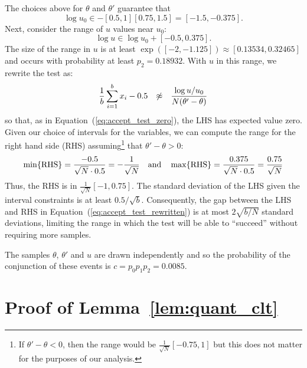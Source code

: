 \documentclass{article}
\begin{document}
The choices above for $\theta$ and $\theta'$ guarantee that
\begin{equation}\label{eq:log_uo_range}
    \log u_0 \in -[0.5,1][0.75,1.5] = [-1.5, -0.375].
\end{equation}
Next, consider the range of $u$ values near $u_0$:
\begin{equation}\label{eq:log_u_range}
    \log u \in \log u_0 + [-0.5,0.375].
\end{equation}
The size of the range in $u$ is at least $\exp([-2,-1.125]) \approx
[0.13534,0.32465]$ and occurs with probability at least $p_2=0.18932$. With $u$
in this range, we rewrite the test as:
\begin{equation}\label{eq:accept_test_rewritten}
    \frac{1}{b}\sum_{i=1}^b x_i-0.5 \hspace{0.1in} \not\approx \hspace{0.1in} \frac{\log u/u_0}{N(\theta'-\theta)}
\end{equation}
so that, as in Equation~(\ref{eq:accept_test_zero}), the LHS has expected value
zero.  Given our choice of intervals for the variables, we can compute the range
for the right hand side (RHS) assuming\footnote{If $\theta'-\theta<0$, then the
range would be $\frac{1}{\sqrt{N}}[-0.75,1]$ but this does not matter for
the purposes of our analysis.} that $\theta'-\theta > 0$:
\begin{equation}\label{eq:rhs_range}
\min\{{\rm RHS}\} = \frac{-0.5}{\sqrt{N} \cdot 0.5} = -\frac{1}{\sqrt{N}}
\quad {\rm and} \quad \max\{{\rm RHS}\} = \frac{0.375}{\sqrt{N} \cdot 0.5} = \frac{0.75}{\sqrt{N}}
\end{equation}
Thus, the RHS is in $\frac{1}{\sqrt{N}}[-1,0.75]$.  The standard deviation of
the LHS given the interval constraints is at least $0.5/\sqrt{b}$.
Consequently, the gap between the LHS and RHS in
Equation~(\ref{eq:accept_test_rewritten}) is at most $2\sqrt{b/N}$ standard
deviations, limiting the range in which the test will be able to ``succeed''
without requiring more samples.

The samples $\theta$, $\theta'$ and $u$ are drawn independently and so the
probability of the conjunction of these events is $c = p_0 p_1 p_2 = 0.0085$.




\section{Proof of Lemma~\ref{lem:quant_clt}}\label{app:quant_clt}
\end{document}
